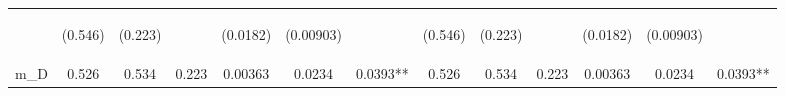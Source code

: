 \documentclass[]{article}
\begin{document}
\begin{center}
\begin{tabular}{lcccccccccccc}
\vspace{4pt} & \begin{footnotesize}(0.546)\end{footnotesize} & \begin{footnotesize}(0.223)\end{footnotesize} & \begin{footnotesize}\end{footnotesize} & \begin{footnotesize}(0.0182)\end{footnotesize} & \begin{footnotesize}(0.00903)\end{footnotesize} & \begin{footnotesize}\end{footnotesize} & \begin{footnotesize}(0.546)\end{footnotesize} & \begin{footnotesize}(0.223)\end{footnotesize} & \begin{footnotesize}\end{footnotesize} & \begin{footnotesize}(0.0182)\end{footnotesize} & \begin{footnotesize}(0.00903)\end{footnotesize} & \begin{footnotesize}\end{footnotesize} \\
m\_D & 0.526 & 0.534 & 0.223 & 0.00363 & 0.0234 & 0.0393** & 0.526 & 0.534 & 0.223 & 0.00363 & 0.0234 & 0.0393** \\

\end{tabular}
\end{center}
\end{document}
